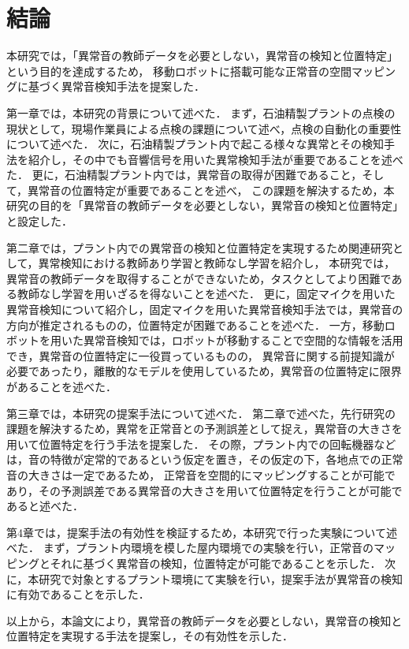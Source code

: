 \documentclass[../main]{subfiles}
\begin{document}
\section{結論}
\label{sec:conc_conclusion}
本研究では，「異常音の教師データを必要としない，異常音の検知と位置特定」という目的を達成するため，
移動ロボットに搭載可能な正常音の空間マッピングに基づく異常音検知手法を提案した．

第一章では，本研究の背景について述べた．
まず，石油精製プラントの点検の現状として，現場作業員による点検の課題について述べ，点検の自動化の重要性について述べた．
次に，石油精製プラント内で起こる様々な異常とその検知手法を紹介し，その中でも音響信号を用いた異常検知手法が重要であることを述べた．
更に，石油精製プラント内では，異常音の取得が困難であること，そして，異常音の位置特定が重要であることを述べ，
この課題を解決するため，本研究の目的を「異常音の教師データを必要としない，異常音の検知と位置特定」と設定した．

第二章では，プラント内での異常音の検知と位置特定を実現するため関連研究として，異常検知における教師あり学習と教師なし学習を紹介し，
本研究では，異常音の教師データを取得することができないため，タスクとしてより困難である教師なし学習を用いざるを得ないことを述べた．
更に，固定マイクを用いた異常音検知について紹介し，固定マイクを用いた異常音検知手法では，異常音の方向が推定されるものの，位置特定が困難であることを述べた．
一方，移動ロボットを用いた異常音検知では，ロボットが移動することで空間的な情報を活用でき，異常音の位置特定に一役買っているものの，
異常音に関する前提知識が必要であったり，離散的なモデルを使用しているため，異常音の位置特定に限界があることを述べた．

第三章では，本研究の提案手法について述べた．
第二章で述べた，先行研究の課題を解決するため，異常を正常音との予測誤差として捉え，異常音の大きさを用いて位置特定を行う手法を提案した．
その際，プラント内での回転機器などは，音の特徴が定常的であるという仮定を置き，その仮定の下，各地点での正常音の大きさは一定であるため，
正常音を空間的にマッピングすることが可能であり，その予測誤差である異常音の大きさを用いて位置特定を行うことが可能であると述べた．

第4章では，提案手法の有効性を検証するため，本研究で行った実験について述べた．
まず，プラント内環境を模した屋内環境での実験を行い，正常音のマッピングとそれに基づく異常音の検知，位置特定が可能であることを示した．
次に，本研究で対象とするプラント環境にて実験を行い，提案手法が異常音の検知に有効であることを示した．

以上から，本論文により，異常音の教師データを必要としない，異常音の検知と位置特定を実現する手法を提案し，その有効性を示した．
\end{document}
